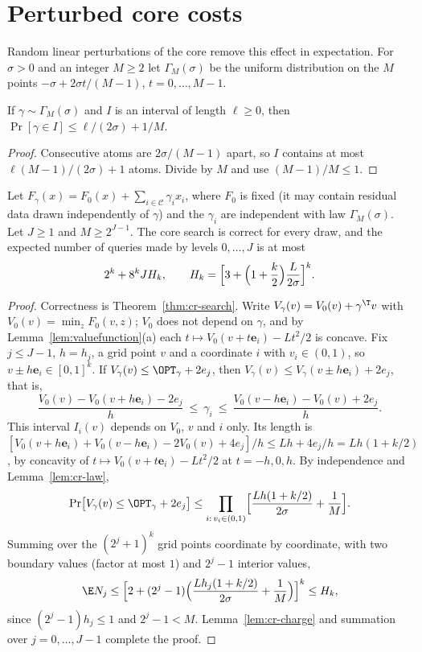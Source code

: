 \section{Perturbed core costs}\label{app:smoothed}
Random linear perturbations of the core remove this effect in
expectation. For $\sigma>0$ and an integer $M\ge2$ let $\Gamma_M(\sigma)$
be the uniform distribution on the $M$ points
$-\sigma+2\sigma t/(M-1)$, $t=0,\ldots,M-1$.

\begin{lemma}\label{lem:cr-law}
If $\gamma\sim\Gamma_M(\sigma)$ and $I$ is an interval of length
$\ell\ge0$, then $\Pr[\gamma\in I]\le\ell/(2\sigma)+1/M$.
\end{lemma}
\begin{proof}
Consecutive atoms are $2\sigma/(M-1)$ apart, so $I$ contains at most
$\ell(M-1)/(2\sigma)+1$ atoms. Divide by $M$ and use $(M-1)/M\le1$.
\end{proof}

\begin{theorem}\label{thm:cr-smoothed}
Let $F_\gamma(x)=F_0(x)+\sum_{i\in\mathcal C}\gamma_ix_i$, where $F_0$ is
fixed (it may contain residual data drawn independently of $\gamma$)
and the $\gamma_i$ are independent with law $\Gamma_M(\sigma)$. Let $J\ge1$
and $M\ge2^{J-1}$. The core search is correct for every draw, and the
expected number of queries made by levels $0,\ldots,J$ is at most
\[
2^k+8^kJH_k,\qquad
H_k=\Bigl[3+\Bigl(1+\frac k2\Bigr)\frac L{2\sigma}\Bigr]^k .
\]
\end{theorem}
\begin{proof}
Correctness is Theorem~\ref{thm:cr-search}. Write
$V_\gamma(v)=V_0(v)+\gamma^{\T}v$ with
$V_0(v)=\min_zF_0(v,z)$; $V_0$ does not depend on $\gamma$, and by
Lemma~\ref{lem:valuefunction}(a) each $t\mapsto V_0(v+t\mathbf e_i)-Lt^2/2$ is
concave. Fix $j\le J-1$, $h=h_j$, a grid point $v$ and a coordinate $i$
with $v_i\in(0,1)$, so $v\pm h\mathbf e_i\in[0,1]^k$. If
$V_\gamma(v)\le\OPT_\gamma+2e_j$, then
$V_\gamma(v)\le V_\gamma(v\pm h\mathbf e_i)+2e_j$, that is,
\[
\frac{V_0(v)-V_0(v+h\mathbf e_i)-2e_j}{h}\ \le\ \gamma_i\ \le\
\frac{V_0(v-h\mathbf e_i)-V_0(v)+2e_j}{h}.
\]
This interval $I_i(v)$ depends on $V_0$, $v$ and $i$ only. Its length is
$[V_0(v+h\mathbf e_i)+V_0(v-h\mathbf e_i)-2V_0(v)+4e_j]/h\le Lh+4e_j/h
=Lh(1+k/2)$, by concavity of $t\mapsto V_0(v+t\mathbf e_i)-Lt^2/2$ at
$t=-h,0,h$. By independence and Lemma~\ref{lem:cr-law},
\[
\Pr\bigl[V_\gamma(v)\le\OPT_\gamma+2e_j\bigr]\le
\prod_{i:\,v_i\in(0,1)}\Bigl[\frac{Lh(1+k/2)}{2\sigma}+\frac1M\Bigr].
\]
Summing over the $(2^j+1)^k$ grid points coordinate by coordinate, with
two boundary values (factor at most $1$) and $2^j-1$ interior values,
\[
\E N_j\le\Bigl[2+(2^j-1)\Bigl(\frac{Lh_j(1+k/2)}{2\sigma}+\frac1M\Bigr)\Bigr]^k
\le H_k ,
\]
since $(2^j-1)h_j\le1$ and $2^j-1<M$. Lemma~\ref{lem:cr-charge} and
summation over $j=0,\ldots,J-1$ complete the proof.
\end{proof}


